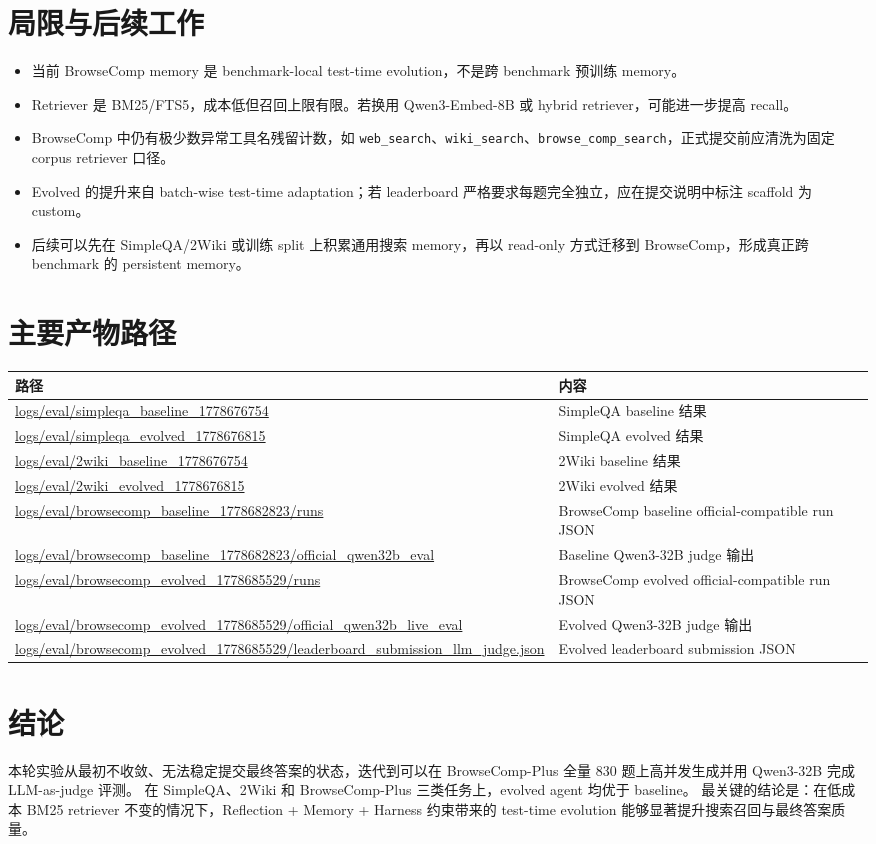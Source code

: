 \documentclass[UTF8,a4paper,11pt]{ctexart}
\begin{document}
\section{局限与后续工作}

\begin{itemize}
  \item 当前 BrowseComp memory 是 benchmark-local test-time evolution，不是跨 benchmark 预训练 memory。
  \item Retriever 是 BM25/FTS5，成本低但召回上限有限。若换用 Qwen3-Embed-8B 或 hybrid retriever，可能进一步提高 recall。
  \item BrowseComp 中仍有极少数异常工具名残留计数，如 \texttt{web\_search}、\texttt{wiki\_search}、\texttt{browse\_comp\_search}，正式提交前应清洗为固定 corpus retriever 口径。
  \item Evolved 的提升来自 batch-wise test-time adaptation；若 leaderboard 严格要求每题完全独立，应在提交说明中标注 scaffold 为 custom。
  \item 后续可以先在 SimpleQA/2Wiki 或训练 split 上积累通用搜索 memory，再以 read-only 方式迁移到 BrowseComp，形成真正跨 benchmark 的 persistent memory。
\end{itemize}

\section{主要产物路径}

\begin{longtable}{p{}p{}}
\toprule
路径 & 内容 \\
\midrule
\endhead
\url{logs/eval/simpleqa_baseline_1778676754} & SimpleQA baseline 结果 \\
\url{logs/eval/simpleqa_evolved_1778676815} & SimpleQA evolved 结果 \\
\url{logs/eval/2wiki_baseline_1778676754} & 2Wiki baseline 结果 \\
\url{logs/eval/2wiki_evolved_1778676815} & 2Wiki evolved 结果 \\
\url{logs/eval/browsecomp_baseline_1778682823/runs} & BrowseComp baseline official-compatible run JSON \\
\url{logs/eval/browsecomp_baseline_1778682823/official_qwen32b_eval} & Baseline Qwen3-32B judge 输出 \\
\url{logs/eval/browsecomp_evolved_1778685529/runs} & BrowseComp evolved official-compatible run JSON \\
\url{logs/eval/browsecomp_evolved_1778685529/official_qwen32b_live_eval} & Evolved Qwen3-32B judge 输出 \\
\url{logs/eval/browsecomp_evolved_1778685529/leaderboard_submission_llm_judge.json} & Evolved leaderboard submission JSON \\
\bottomrule
\end{longtable}

\section{结论}

本轮实验从最初不收敛、无法稳定提交最终答案的状态，迭代到可以在 BrowseComp-Plus 全量 830 题上高并发生成并用 Qwen3-32B 完成 LLM-as-judge 评测。
在 SimpleQA、2Wiki 和 BrowseComp-Plus 三类任务上，evolved agent 均优于 baseline。
最关键的结论是：在低成本 BM25 retriever 不变的情况下，Reflection + Memory + Harness 约束带来的 test-time evolution 能够显著提升搜索召回与最终答案质量。
\end{document}
